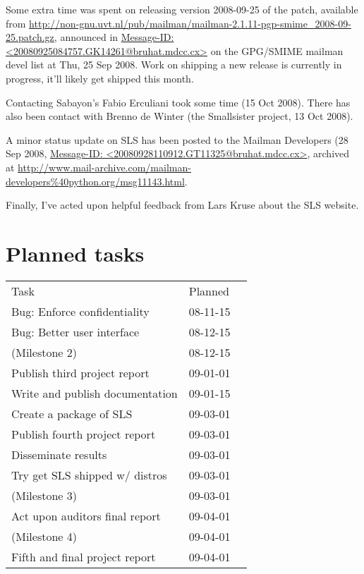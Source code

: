 \documentclass[a4]{article}
\begin{document}
Some extra time was spent on releasing version 2008-09-25 of the patch,
available from
\url{http://non-gnu.uvt.nl/pub/mailman/mailman-2.1.11-pgp-smime_2008-09-25.patch.gz},
announced in \url{Message-ID: <20080925084757.GK14261@bruhat.mdcc.cx>} on the
GPG/SMIME mailman devel list at Thu, 25 Sep 2008.  Work on shipping a new
release is currently in progress, it'll likely get shipped this month.

Contacting Sabayon's Fabio Erculiani took some time (15 Oct 2008).  There has
also been contact with Brenno de Winter (the Smallsister project, 13 Oct 2008).

A minor status update on SLS has been posted to the Mailman Developers (28 Sep
2008, \url{Message-ID: <20080928110912.GT11325@bruhat.mdcc.cx>}, archived at
\url{http://www.mail-archive.com/mailman-developers%40python.org/msg11143.html}.

Finally, I've acted upon helpful feedback from Lars Kruse about the SLS
website.

\section{Planned tasks}

\begin{tabular}{lll}
 Task                            & Planned  \\ \cline{1-2}
 Bug: Enforce confidentiality    & 08-11-15 \\
 Bug: Better user interface      & 08-12-15 \\
 (Milestone 2)                   & 08-12-15 \\
 Publish third project report    & 09-01-01 \\
 Write and publish documentation & 09-01-15 \\
 Create a package of SLS         & 09-03-01 \\
 Publish fourth project report   & 09-03-01 \\
 Disseminate results             & 09-03-01 \\
 Try get SLS shipped w/ distros  & 09-03-01 \\
 (Milestone 3)                   & 09-03-01 \\
 Act upon auditors final report  & 09-04-01 \\
 (Milestone 4)                   & 09-04-01 \\
 Fifth and final project report  & 09-04-01 \\
\end{tabular}
\end{document}
